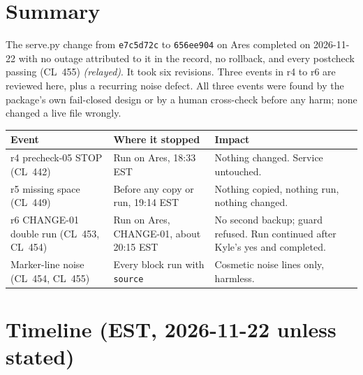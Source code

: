 \documentclass[10pt]{article}
\newcommand{\CL}[1]{CL~#1}
\newcommand{\relay}{\textit{(relayed)}}
\begin{document}
\section{Summary}

The serve.py change from \texttt{e7c5d72c} to \texttt{656ee904} on Ares completed on 2026-11-22 with no outage attributed to it in the record, no rollback, and every postcheck passing (\CL{455}) \relay{}. It took six revisions. Three events in r4 to r6 are reviewed here, plus a recurring noise defect. All three events were found by the package's own fail-closed design or by a human cross-check before any harm; none changed a live file wrongly.

\begin{longtable}{@{}L{1.25in}L{1.6in}L{3.45in}@{}}
\toprule
\textbf{Event} & \textbf{Where it stopped} & \textbf{Impact} \\
\midrule
\endhead
r4 precheck-05 STOP (\CL{442}) & Run on Ares, 18:33 EST & Nothing changed. Service untouched. \\
r5 missing space (\CL{449}) & Before any copy or run, 19:14 EST & Nothing copied, nothing run, nothing changed. \\
r6 CHANGE-01 double run (\CL{453}, \CL{454}) & Run on Ares, CHANGE-01, about 20:15 EST & No second backup; guard refused. Run continued after Kyle's yes and completed. \\
Marker-line noise (\CL{454}, \CL{455}) & Every block run with \texttt{source} & Cosmetic noise lines only, harmless. \\
\bottomrule
\end{longtable}

\section{Timeline (EST, 2026-11-22 unless stated)}
\end{document}
